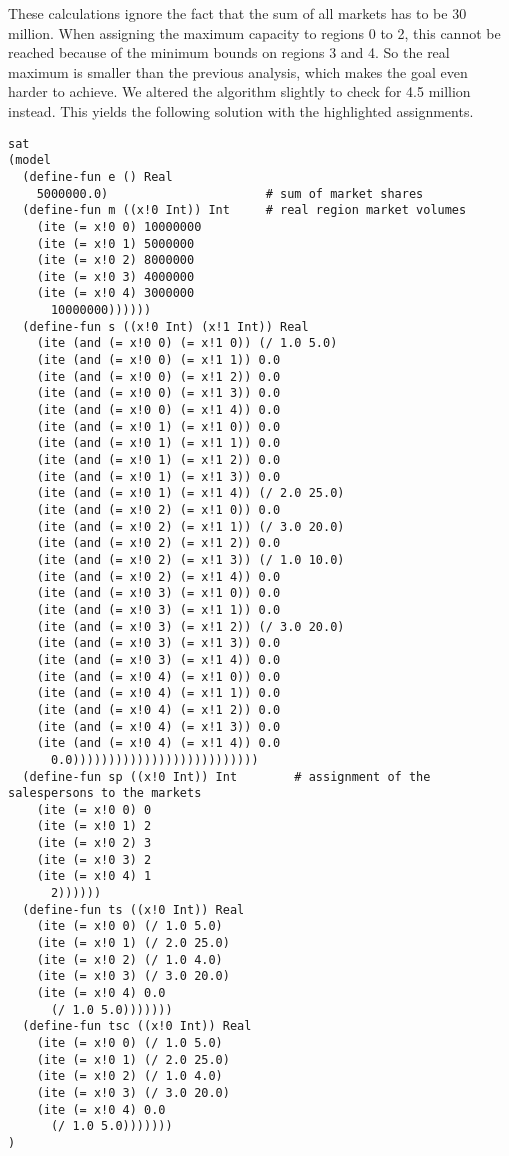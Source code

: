 \documentclass{base}
\begin{document}
These calculations ignore the fact that the sum of all markets has to be 30 million. When assigning the maximum capacity to regions 0 to 2, this cannot be reached because of the minimum bounds on regions 3 and 4. So the real maximum is smaller than the previous analysis, which makes the goal even harder to achieve.
We altered the algorithm slightly to check for 4.5 million instead. This yields the following solution with the highlighted assignments.
\begin{lstlisting}
sat
(model 
  (define-fun e () Real
    5000000.0)                      # sum of market shares
  (define-fun m ((x!0 Int)) Int     # real region market volumes
    (ite (= x!0 0) 10000000
    (ite (= x!0 1) 5000000
    (ite (= x!0 2) 8000000
    (ite (= x!0 3) 4000000
    (ite (= x!0 4) 3000000
      10000000))))))
  (define-fun s ((x!0 Int) (x!1 Int)) Real
    (ite (and (= x!0 0) (= x!1 0)) (/ 1.0 5.0)
    (ite (and (= x!0 0) (= x!1 1)) 0.0
    (ite (and (= x!0 0) (= x!1 2)) 0.0
    (ite (and (= x!0 0) (= x!1 3)) 0.0
    (ite (and (= x!0 0) (= x!1 4)) 0.0
    (ite (and (= x!0 1) (= x!1 0)) 0.0
    (ite (and (= x!0 1) (= x!1 1)) 0.0
    (ite (and (= x!0 1) (= x!1 2)) 0.0
    (ite (and (= x!0 1) (= x!1 3)) 0.0
    (ite (and (= x!0 1) (= x!1 4)) (/ 2.0 25.0)
    (ite (and (= x!0 2) (= x!1 0)) 0.0
    (ite (and (= x!0 2) (= x!1 1)) (/ 3.0 20.0)
    (ite (and (= x!0 2) (= x!1 2)) 0.0
    (ite (and (= x!0 2) (= x!1 3)) (/ 1.0 10.0)
    (ite (and (= x!0 2) (= x!1 4)) 0.0
    (ite (and (= x!0 3) (= x!1 0)) 0.0
    (ite (and (= x!0 3) (= x!1 1)) 0.0
    (ite (and (= x!0 3) (= x!1 2)) (/ 3.0 20.0)
    (ite (and (= x!0 3) (= x!1 3)) 0.0
    (ite (and (= x!0 3) (= x!1 4)) 0.0
    (ite (and (= x!0 4) (= x!1 0)) 0.0
    (ite (and (= x!0 4) (= x!1 1)) 0.0
    (ite (and (= x!0 4) (= x!1 2)) 0.0
    (ite (and (= x!0 4) (= x!1 3)) 0.0
    (ite (and (= x!0 4) (= x!1 4)) 0.0
      0.0))))))))))))))))))))))))))
  (define-fun sp ((x!0 Int)) Int        # assignment of the salespersons to the markets
    (ite (= x!0 0) 0
    (ite (= x!0 1) 2
    (ite (= x!0 2) 3
    (ite (= x!0 3) 2
    (ite (= x!0 4) 1
      2))))))
  (define-fun ts ((x!0 Int)) Real
    (ite (= x!0 0) (/ 1.0 5.0)
    (ite (= x!0 1) (/ 2.0 25.0)
    (ite (= x!0 2) (/ 1.0 4.0)
    (ite (= x!0 3) (/ 3.0 20.0)
    (ite (= x!0 4) 0.0
      (/ 1.0 5.0)))))))
  (define-fun tsc ((x!0 Int)) Real
    (ite (= x!0 0) (/ 1.0 5.0)
    (ite (= x!0 1) (/ 2.0 25.0)
    (ite (= x!0 2) (/ 1.0 4.0)
    (ite (= x!0 3) (/ 3.0 20.0)
    (ite (= x!0 4) 0.0
      (/ 1.0 5.0)))))))
)
\end{lstlisting}
\end{document}
